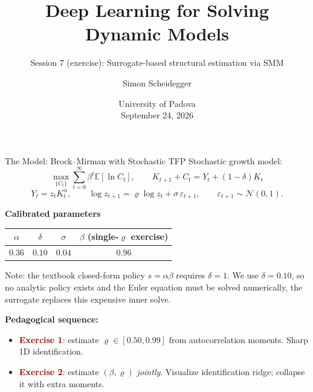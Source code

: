\documentclass[10pt,aspectratio=169]{beamer}
\title[SMM exercise -- Padova 2026]%
{Deep Learning for Solving Dynamic Models}
\subtitle{Session 7 (exercise): Surrogate-based structural estimation via SMM}
\author{Simon Scheidegger}
\institute[HEC Lausanne]{HEC, University of Lausanne}
\date{University of Padova\\September 24, 2026}
\newcommand{\E}[1]{\mathbb{E}\!\left[#1\right]}
\newcommand{\emphc}[1]{\textbf{\textcolor{darkred}{#1}}}
\begin{document}
{
\begin{frame}
\titlepage
\end{frame}
}

\begin{frame}{The Model: Brock--Mirman with Stochastic TFP}
\small
Stochastic growth model:
\vspace{-4pt}
\[
\max_{\{C_t\}} \sum_{t=0}^{\infty} \beta^t \E{\ln C_t}, \qquad
K_{t+1} + C_t = Y_t + (1-\delta)K_t
\]
\vspace{-12pt}
\[
Y_t = z_t K_t^\alpha, \qquad \log z_{t+1} = \varrho\log z_t + \sigma\,\varepsilon_{t+1}, \qquad \varepsilon_{t+1}\sim\mathcal{N}(0,1).
\]

\textbf{Calibrated parameters}
\begin{center}\begin{tabular}{cccc}
\toprule
$\alpha$ & $\delta$ & $\sigma$ & $\beta$ (single-$\varrho$ exercise) \\
\midrule
$0.36$ & $0.10$ & $0.04$ & $0.96$ \\
\bottomrule
\end{tabular}\end{center}
\vspace{-0.05cm}
{\scriptsize Note: the textbook closed-form policy $s = \alpha\beta$ requires $\delta = 1$. We use $\delta = 0.10$, so no analytic policy exists and the Euler equation must be solved numerically, the surrogate replaces this expensive inner solve.}

\textbf{Pedagogical sequence:}
\begin{itemize}
\itemsep0pt
\item \emphc{Exercise 1}: estimate $\varrho \in [0.50, 0.99]$ from autocorrelation moments. Sharp 1D identification.
\item \emphc{Exercise 2}: estimate $(\beta, \varrho)$ \emph{jointly}. Visualize identification ridge; collapse it with extra moments.
\end{itemize}
\end{frame}
\end{document}
